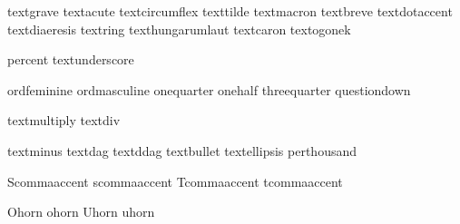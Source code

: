  textgrave        {}
 textacute        {}
 textcircumflex   {}
 texttilde        {}
 textmacron       {}
 textbreve        {}
 textdotaccent    {}
 textdiaeresis    {}
 textring         {}
 texthungarumlaut {}
 textcaron        {}
 textogonek       {}

 percent          {}
 textunderscore   {}

 ordfeminine      {}
 ordmasculine     {}
 onequarter       {}
 onehalf          {}
 threequarter     {}
 questiondown     {}

 textmultiply     {}
 textdiv          {}

 textminus        {}
 textdag          {}
 textddag         {}
 textbullet       {}
 textellipsis     {}
 perthousand      {}

 Scommaaccent     {}
 scommaaccent     {}
 Tcommaaccent     {}
 tcommaaccent     {}

\stopencoding


\startencoding[uc]

   Ohorn                {}
   ohorn                {}
   Uhorn                {}
   uhorn                {}

